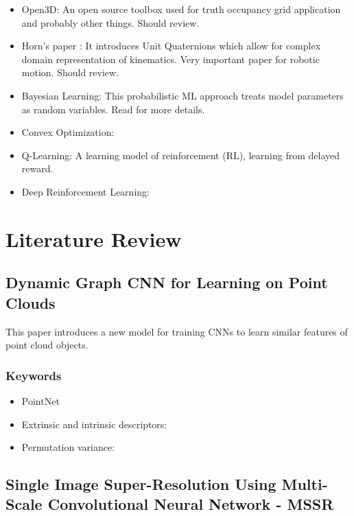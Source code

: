 \documentclass[11pt]{article}
\begin{document}
\begin{itemize}
	\item Open3D: An open source toolbox used for truth occupancy grid application and probably other things. Should review. 
	
	\item Horn's paper \cite{HornsMethod}: It introduces Unit Quaternions which allow for complex domain representation of kinematics. Very important paper for robotic motion. Should review.
	
	\item Bayesian Learning: This probabilistic ML approach treats model parameters as random variables. Read \cite{Bayesian_Learning_2012} for more details. 
	
	\item Convex Optimization:
	
	\item Q-Learning: A learning model of reinforcement (RL), learning from delayed reward. 
	
	\item Deep Reinforcement Learning: 
\end{itemize}

\section{Literature Review}

\subsection{Dynamic Graph CNN for Learning on Point Clouds \cite{DGCNNLPC}}
 This paper introduces a new model for training CNNs to learn similar features of point cloud objects. 

\subsubsection{Keywords}
\begin{itemize}
	\item PointNet
	\item Extrinsic and intrinsic descriptors:
	\item Permutation variance:
	
\end{itemize}

\subsection{Single Image Super-Resolution Using Multi-Scale Convolutional Neural Network - MSSR \cite{MSSRwCNN}}
\end{document}
